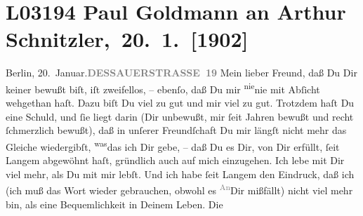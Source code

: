 

\section[ Paul Goldmann an Arthur Schnitzler, 20. 1. {[}1902{]}]{L03194 Paul Goldmann an Arthur Schnitzler, 20. 1. {[}1902{]}}
\nopagebreak{}
\rehead{ }\normalsize\beginnumbering{}
\toendnotes[C]{\smallbreak\pagebreak[2]}
\toendnotes[C]{\smallbreak}
\pstart
           {\pb}Berlin, 20. Januar.\hfill \textcolor{gray}{\textbf{DESSAUERSTRASSE 19}}\pend
           \vspace{0.5em}
\pstart
           Mein lieber Freund, daß Du Dir keiner \label{K_L03194-1v}\label{K_L03194-1} bewußt biſt, iſt zweifellos, – ebenſo, daß Du mir \substVorne{}\textsuperscript{nie}\substDazwischen{}nie\substHinten{} mit Abſicht wehgethan haſt. Dazu biſt Du viel zu gut und mir viel zu gut.
                   Trotzdem haſt Du eine Schuld, und ſie liegt darin (Dir unbewußt, mir ſeit
               Jahren bewußt und recht ſchmerzlich bewußt), daß in unſerer Freundſchaft Du mir
               längſt nicht mehr das Gleiche wiedergibſt, \substVorne{}\textsuperscript{was}\substDazwischen{}das\substHinten{} ich Dir gebe, – daß Du  es Dir, von
               Dir erfüllt, ſeit Langem abgewöhnt haſt, \strikeout{\textcolor{gray}{r}} gründlich auch auf mich einzugehen. Ich lebe mit Dir viel mehr, als Du mit mir
               lebſt. Und ich habe ſeit Langem den Eindruck, daß ich (ich muß das Wort wieder
               gebrauchen,  obwohl es \substVorne{}\textsuperscript{\textcolor{gray}{An}}\substDazwischen{}Dir\substHinten{} mißfällt) nicht viel mehr bin, als eine Bequemlichkeit in Deinem Leben. Die
